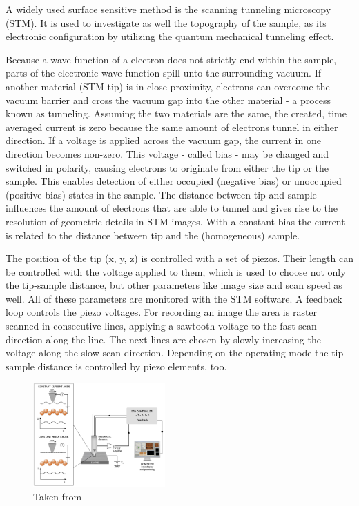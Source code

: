A widely used surface sensitive method is the scanning tunneling microscopy (STM).  It is used to investigate as well the topography of the sample, as its electronic configuration by utilizing the quantum mechanical tunneling effect. 

Because a wave function of a electron does not strictly end within the sample, parts of the electronic wave function spill unto the surrounding vacuum. If another material (STM tip) is in close proximity, electrons can overcome the vacuum barrier and cross the vacuum gap into the other material - a process known as tunneling.  Assuming the two materials are the same, the created, time averaged current is zero because the same amount of electrons tunnel in either direction. If a voltage is applied across the vacuum gap, the current in one direction becomes non-zero. This voltage - called bias - may be changed and switched in polarity, causing electrons to originate from either the tip or the sample. This enables detection of either occupied (negative bias) or unoccupied (positive bias) states in the sample. The distance between tip and sample influences the amount of electrons that are able to tunnel and gives rise to the resolution of geometric details in STM images. With a constant bias the current is related to the distance between tip and the (homogeneous) sample.

The position of the tip (x, y, z) is controlled with a set of piezos. Their length can be controlled with the voltage applied to them, which is used to choose not only the tip-sample distance, but other parameters like image size and scan speed as well. All of these parameters are monitored with the STM software. A feedback loop controls the piezo voltages. For recording an image the area is raster scanned in consecutive lines, applying a sawtooth voltage to the fast scan direction along the line. The next lines are chosen by slowly increasing the voltage along the slow scan direction. Depending on the operating mode the tip-sample distance is controlled by piezo elements, too.

\begin{figure}[ht]
	\begin{center}
	\includegraphics[width=0.45\textwidth]{./images/STM-sketch.jpg}
	\end{center}
	\caption{Taken from \cite{diss-manuela}}
	\label{fig:STM-modes}
\end{figure}

